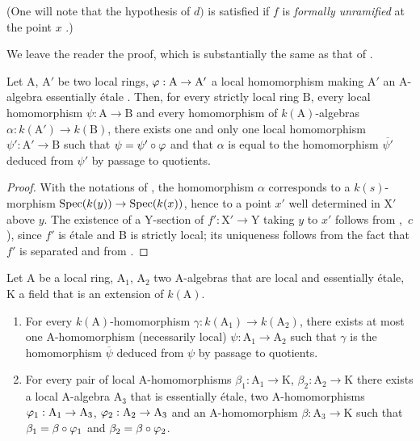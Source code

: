 
(One will note that the hypothesis of $d)$ is satisfied if $f$ is \emph{formally unramified} at the point $x$ .)

We leave the reader the proof, which is substantially the same as that of .

\begin{lemma}[18.8.4]
\label{IV.18.8.4}
Let $\mathrm{A}$, $\mathrm{A}'$ be two local rings, $\varphi:\mathrm{A}\to\mathrm{A}'$ a local homomorphism making $\mathrm{A}'$ an A-algebra essentially \'{e}tale .
Then, for every strictly local ring $\mathrm{B}$, every local homomorphism $\psi:\mathrm{A}\to\mathrm{B}$ and every homomorphism of $k(\mathrm{A})$-algebras $\alpha:k(\mathrm{A}')\to k(\mathrm{B})$, there exists one and only one local homomorphism $\psi':\mathrm{A}'\to\mathrm{B}$ such that $\psi=\psi'\circ\varphi$ and that $\alpha$ is equal to the homomorphism $\overline{\psi'}$ deduced from $\psi'$ by passage to quotients.
\end{lemma}

\begin{proof}
With the notations of , the homomorphism $\alpha$ corresponds to a $k(s)$-morphism $\operatorname{Spec}(k(y))\to\operatorname{Spec}(k(x))$, hence to a point $x'$ well determined in $\mathrm{X}'$ above $y$.
The existence of a Y-section of $f':\mathrm{X}'\to\mathrm{Y}$ taking $y$ to $x'$ follows from ,~$c$), since $f'$ is \'{e}tale and B is strictly local; its uniqueness follows from the fact that $f'$ is separated and from .
\end{proof}

\begin{lemma}[18.8.5]
\label{IV.18.8.5}
Let $\mathrm{A}$ be a local ring, $\mathrm{A}_1$, $\mathrm{A}_2$ two A-algebras that are local and essentially \'{e}tale, K a field that is an extension of $k(\mathrm{A})$.
\begin{enumerate}[label=\emph{\roman*)}]
  \item For every $k(\mathrm{A})$-homomorphism $\gamma:k(\mathrm{A}_1)\to k(\mathrm{A}_2)$, there exists at most one A-homomorphism (necessarily local) $\psi:\mathrm{A}_1\to\mathrm{A}_2$ such that $\gamma$ is the homomorphism $\overline{\psi}$ deduced from $\psi$ by passage to quotients.
  \item For every pair of local A-homomorphisms $\beta_1:\mathrm{A}_1\to\mathrm{K}$, $\beta_2:\mathrm{A}_2\to\mathrm{K}$ there exists a local A-algebra $\mathrm{A}_3$ that is essentially \'{e}tale, two A-homomorphisms $\varphi_1:\mathrm{A}_1\to\mathrm{A}_3$, $\varphi_2:\mathrm{A}_2\to\mathrm{A}_3$ and an A-homomorphism $\beta:\mathrm{A}_3\to\mathrm{K}$ such that $\beta_1=\beta\circ\varphi_1$ and $\beta_2=\beta\circ\varphi_2$.
\end{enumerate}
\end{lemma}

